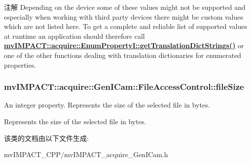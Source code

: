 \begin{DoxyNote}{注解}
Depending on the device some of these values might not be supported and especially when working with third party devices there might be custom values which are not listed here. To get a complete and reliable list of supported values at runtime an application should therefore call {\bfseries \hyperlink{classmv_i_m_p_a_c_t_1_1acquire_1_1_enum_property_i_a0ba6ccbf5ee69784d5d0b537924d26b6}{mv\+I\+M\+P\+A\+C\+T\+::acquire\+::\+Enum\+Property\+I\+::get\+Translation\+Dict\+Strings()}} or one of the other functions dealing with translation dictionaries for enumerated properties. 
\end{DoxyNote}
\hypertarget{classmv_i_m_p_a_c_t_1_1acquire_1_1_gen_i_cam_1_1_file_access_control_aa1ce3e612b1e7a27711d8590471cf3bc}{
\subsubsection[{file\+Size}]{ mv\+I\+M\+P\+A\+C\+T\+::acquire\+::\+Gen\+I\+Cam\+::\+File\+Access\+Control\+::file\+Size}}\label{classmv_i_m_p_a_c_t_1_1acquire_1_1_gen_i_cam_1_1_file_access_control_aa1ce3e612b1e7a27711d8590471cf3bc}


An integer property. Represents the size of the selected file in bytes. 

Represents the size of the selected file in bytes. 

该类的文档由以下文件生成\+:\begin{DoxyCompactItemize}
\item 
mv\+I\+M\+P\+A\+C\+T\+\_\+\+C\+P\+P/mv\+I\+M\+P\+A\+C\+T\+\_\+acquire\+\_\+\+Gen\+I\+Cam.\+h\end{DoxyCompactItemize}
